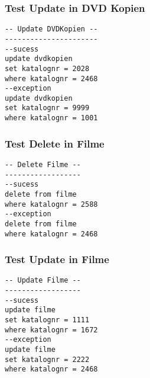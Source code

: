 \documentclass[11pt,a4paper,parskip=half]{scrartcl}
\begin{document}
\subsubsection{Test Update in DVD Kopien}
\begin{lstlisting}
-- Update DVDKopien --
----------------------
--sucess
update dvdkopien
set katalognr = 2028
where katalognr = 2468
--exception
update dvdkopien
set katalognr = 9999
where katalognr = 1001
\end{lstlisting}

\subsubsection{Test Delete in Filme}
\begin{lstlisting}
-- Delete Filme --
------------------
--sucess
delete from filme
where katalognr = 2588
--exception
delete from filme
where katalognr = 2468
\end{lstlisting}


\subsubsection{Test Update in Filme}
\begin{lstlisting}
-- Update Filme --
------------------
--sucess
update filme
set katalognr = 1111
where katalognr = 1672
--exception
update filme
set katalognr = 2222
where katalognr = 2468
\end{lstlisting}
\end{document}
